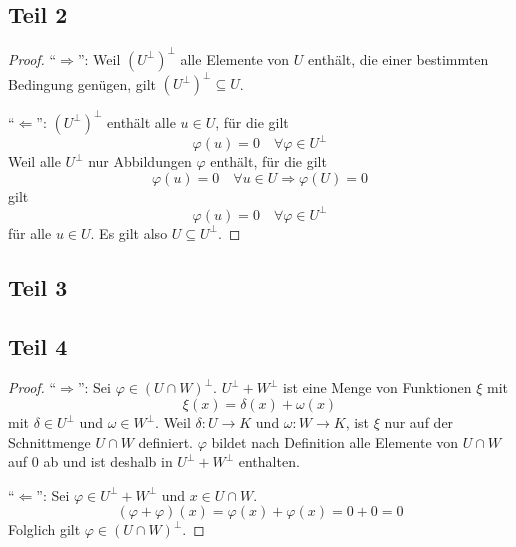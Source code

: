 \documentclass[a4paper,10pt]{article}
\begin{document}
\subsection*{Teil 2}

\begin{proof}
 ``$\Rightarrow$'': Weil $(U^\perp)^\perp$ alle Elemente von $U$ enthält, die einer bestimmten Bedingung genügen, gilt $(U^\perp)^\perp \subseteq U$.
 
 ``$\Leftarrow$'': $(U^\perp)^\perp$ enthält alle $u \in U$, für die gilt
 \begin{equation}
  \varphi(u) = 0 \quad \forall \varphi \in U^\perp
 \end{equation}
 Weil alle $U^\perp$ nur Abbildungen $\varphi$ enthält, für die gilt
 \begin{equation}
  \varphi(u) = 0 \quad \forall u \in U \Rightarrow \varphi(U) = 0
 \end{equation}
 gilt
 \begin{equation}
  \varphi(u) = 0 \quad \forall \varphi \in U^\perp
 \end{equation}
 für alle $u \in U$.
 Es gilt also $U \subseteq U^\perp$.
\end{proof}

\subsection*{Teil 3}

\subsection*{Teil 4}

\begin{proof}
 ``$\Rightarrow$'': Sei $\varphi \in (U \cap W)^\perp$.
 $U^\perp + W^\perp$ ist eine Menge von Funktionen $\xi$ mit
 \begin{equation}
  \xi(x) = \delta(x) + \omega(x)
 \end{equation}
 mit $\delta \in U^\perp$ und $\omega \in W^\perp$.
 Weil $\delta: U \rightarrow K$ und $\omega: W \rightarrow K$, ist $\xi$ nur auf der Schnittmenge $U \cap W$ definiert.
 $\varphi$ bildet nach Definition alle Elemente von $U \cap W$ auf $0$ ab und ist deshalb in $U^\perp + W^\perp$ enthalten.
 
 ``$\Leftarrow$'': Sei $\varphi \in U^\perp + W^\perp$ und $x \in U \cap W$.
 \begin{equation}
  (\varphi + \varphi)(x) = \varphi(x) + \varphi(x) = 0 + 0 = 0
 \end{equation}
 Folglich gilt $\varphi \in (U \cap W)^\perp$.
\end{proof}
\end{document}
